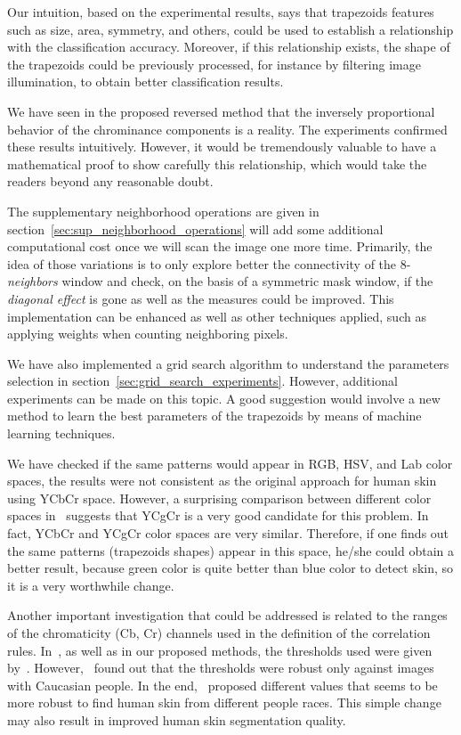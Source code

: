 Our intuition, based on the experimental results, says that trapezoids features such as size, area, symmetry, and others, could be used to establish a relationship with the classification accuracy. Moreover, if this relationship exists, the shape of the trapezoids could be previously processed, for instance by filtering image illumination, to obtain better classification results.

We have seen in the proposed reversed method that the inversely proportional behavior of the chrominance components is a reality. The experiments confirmed these results intuitively. However, it would be tremendously valuable to have a mathematical proof to show carefully this relationship, which would take the readers beyond any reasonable doubt.

The supplementary neighborhood operations are given in section~\ref{sec:sup_neighborhood_operations} will add some additional computational cost once we will scan the image one more time. Primarily, the idea of those variations is to only explore better the connectivity of the 8-\textit{neighbors} window and check, on the basis of a symmetric mask window, if the \textit{diagonal effect} is gone as well as the measures could be improved. This implementation can be enhanced as well as other techniques applied, such as applying weights when counting neighboring pixels.

We have also implemented a grid search algorithm to understand the parameters selection in section~\ref{sec:grid_search_experiments}. However, additional experiments can be made on this topic. A good suggestion would involve a new method to learn the best parameters of the trapezoids by means of machine learning techniques.

We have checked if the same patterns would appear in RGB, HSV, and Lab color spaces, the results were not consistent as the original approach for human skin using YCbCr space. However, a surprising comparison between different color spaces in~\citet{chaves:10} suggests that YCgCr is a very good candidate for this problem. In fact, YCbCr and YCgCr color spaces are very similar. Therefore, if one finds out the same patterns (trapezoids shapes) appear in this space, he/she could obtain a better result, because green color is quite better than blue color to detect skin, so it is a very worthwhile change.

Another important investigation that could be addressed is related to the ranges of the chromaticity (Cb, Cr) channels used in the definition of the correlation rules. In~\citet{brancati:17}, as well as in our proposed methods, the thresholds used were given by~\citep{chai:99}. However,~\citet{basilio:11} found out that the thresholds were robust only against images with Caucasian people. In the end,~\citet{basilio:11} proposed different values that seems to be more robust to find human skin from different people races. This simple change may also result in improved human skin segmentation quality.